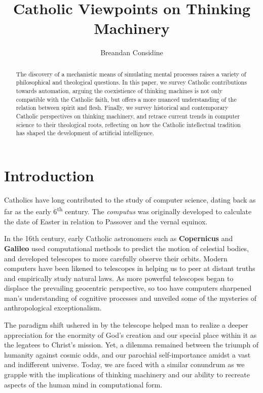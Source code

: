\documentclass[sigplan,nonacm]{acmart}\settopmatter{printfolios=false,printccs=false,printacmref=false}
\begin{document}
  \title{Catholic Viewpoints on Thinking Machinery}
  \begin{abstract}
  The discovery of a mechanistic means of simulating mental processes raises a variety of philosophical and theological questions. In this paper, we survey Catholic contributions towards automation, arguing the coexistience of thinking machines is not only compatible with the Catholic faith, but offers a more nuanced understanding of the relation between spirit and flesh. Finally, we survey historical and contemporary Catholic perspectives on thinking machinery, and retrace current trends in computer science to their theological roots, reflecting on how the Catholic intellectual tradition has shaped the development of artificial intelligence.
  \end{abstract}

  \author{Breandan Considine}

  \maketitle

  \section{Introduction}

  Catholics have long contributed to the study of computer science, dating back as far as the early 6\textsuperscript{th} century. The \textit{computus} was originally developed to calculate the date of Easter in relation to Passover and the vernal equinox.

  In the 16th century, early Catholic astronomers such as \textbf{Copernicus} and \textbf{Galileo} used computational methods to predict the motion of celestial bodies, and developed telescopes to more carefully observe their orbits. Modern computers have been likened to telescopes in helping us to peer at distant truths and empirically study natural laws. As more powerful telescopes began to displace the prevailing geocentric perspective, so too have computers sharpened man's understanding of cognitive processes and unveiled some of the mysteries of anthropological exceptionalism.

  The paradigm shift ushered in by the telescope helped man to realize a deeper appreciation for the enormity of God's creation and our special place within it as the legatees to Christ's mission. Yet, a dilemma remained between the triumph of humanity against cosmic odds, and our parochial self-importance amidst a vast and indifferent universe. Today, we are faced with a similar conundrum as we grapple with the implications of thinking machinery and our ability to recreate aspects of the human mind in computational form.
\end{document}
